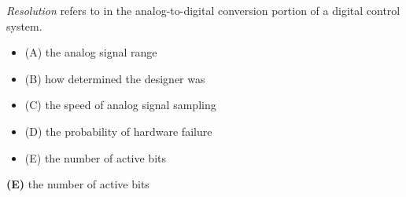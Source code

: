 

{\it Resolution} refers to \underbar{\hskip 50pt} in the analog-to-digital conversion portion of a digital control system.

\begin{itemize}
\item{(A)} the analog signal range
\vskip 5pt 
\item{(B)} how determined the designer was 
\vskip 5pt 
\item{(C)} the speed of analog signal sampling
\vskip 5pt 
\item{(D)} the probability of hardware failure 
\vskip 5pt 
\item{(E)} the number of active bits
\end{itemize}







{\bf (E)} the number of active bits
 










